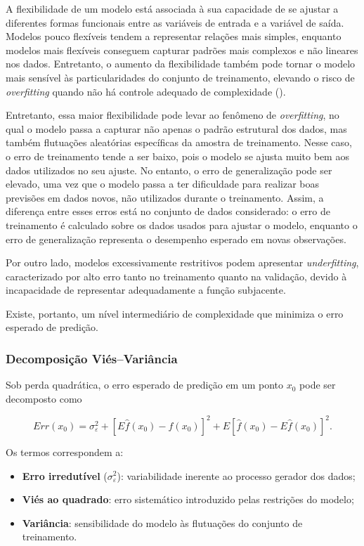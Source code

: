A flexibilidade de um modelo está associada à sua capacidade de se ajustar a diferentes formas funcionais entre as variáveis de entrada e a variável de saída. Modelos pouco flexíveis tendem a representar relações mais simples, enquanto modelos mais flexíveis conseguem capturar padrões mais complexos e não lineares nos dados. Entretanto, o aumento da flexibilidade também pode tornar o modelo mais sensível às particularidades do conjunto de treinamento, elevando o risco de \textit{overfitting} quando não há controle adequado de complexidade (\cite{Hastie2009ESL}).


Entretanto, essa maior flexibilidade pode levar ao fenômeno de \textit{overfitting}, no qual o modelo passa a capturar não apenas o padrão estrutural dos dados, mas também flutuações aleatórias específicas da amostra de treinamento. Nesse caso, o erro de treinamento tende a ser baixo, pois o modelo se ajusta muito bem aos dados utilizados no seu ajuste. No entanto, o erro de generalização pode ser elevado, uma vez que o modelo passa a ter dificuldade para realizar boas previsões em dados novos, não utilizados durante o treinamento. Assim, a diferença entre esses erros está no conjunto de dados considerado: o erro de treinamento é calculado sobre os dados usados para ajustar o modelo, enquanto o erro de generalização representa o desempenho esperado em novas observações.

Por outro lado, modelos excessivamente restritivos podem apresentar \textit{underfitting}, caracterizado por alto erro tanto no treinamento quanto na validação, devido à incapacidade de representar adequadamente a função subjacente.

Existe, portanto, um nível intermediário de complexidade que minimiza o erro esperado de predição.

\subsubsection{Decomposição Viés--Variância}

Sob perda quadrática, o erro esperado de predição em um ponto $x_0$ pode ser decomposto como

\begin{equation}
Err(x_0) = \sigma_\varepsilon^2 
+ \left[ E\hat{f}(x_0) - f(x_0) \right]^2 
+ E\left[ \hat{f}(x_0) - E\hat{f}(x_0) \right]^2.
\end{equation}

Os termos correspondem a:

\begin{itemize}
\item \textbf{Erro irredutível} ($\sigma_\varepsilon^2$): variabilidade inerente ao processo gerador dos dados;
\item \textbf{Viés ao quadrado}: erro sistemático introduzido pelas restrições do modelo;
\item \textbf{Variância}: sensibilidade do modelo às flutuações do conjunto de treinamento.
\end{itemize}

